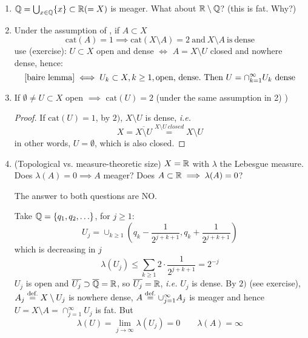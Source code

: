 \documentclass{article}
\begin{document}
\begin{remark}
\label{Baire remark}
\begin{enumerate}[1)]
    \item $\mathbb{Q} = \bigcup_{x\in \mathbb{Q}} \{x\} \subset \mathbb{R} (=X)$ is meager. What about $\mathbb{R} \setminus \mathbb{Q}$? (this is fat. Why?)
    \item Under the assumption of , if $A\subset X$  
    $$
    \text{cat}(A)=1 \implies \text{cat}(X \setminus A)=2 \ \text{and} \ X\setminus A \ \text{is} \ \text{dense}
    $$
    use (exercise): $U \subset X$ open and dense $\iff$ $A = X\setminus U$ closed and nowhere dense, hence:  
    \begin{equation*}
        \text{\Cref{baire lemma}} \iff U_k \subset X, k\geq 1, \text{open,\ dense}. \ \text{Then} \ U = \cap_{k=1}^{\infty} U_k \ \text{dense}
    \end{equation*}
    \item If $\emptyset \neq U \subset X$ open $\implies$ $\text{cat}(U)=2$ (under the same assumption in 2) )
    \begin{proof}
        If $\text{cat}(U)=1$, by $2)$, $X\setminus U$ is dense, \textit{i.e.}  
        $$
        X = \overline{X\setminus U}\overset{X\setminus U \ closed}{=} X\setminus U
        $$
        in other words, $U=\emptyset$, which is also closed.
    \end{proof}
    \item (Topological vs. measure-theoretic size)  $X=\mathbb{R}$ with $\lambda$ the Lebesgue measure. Does $\lambda(A)=0 \implies A $ meager? Does $A \subset \mathbb{R} \implies \lambda(A)=0$?  

    The answer to both questions are NO.  
    
    Take $\mathbb{Q} = \{q_1, q_2, \ldots\}$, for $j\geq 1$:  
    $$
    U_j = \cup_{k\geq 1} (q_k - \frac{1}{2^{j+k+1}}, q_k + \frac{1}{2^{j+k+1}})
    $$ 
    which is decreasing in $j$  
    $$
    \lambda(U_j) \leq \sum_{k\geq 1} 2 \cdot \frac{1}{2^{j+k+1}} = 2^{-j}
    $$
    $U_j$ is open and $\overline{U_j} \supset \overline{\mathbb{Q}} = \mathbb{R}$, so $\overline{U_j} = \mathbb{R}$, \textit{i.e.} $U_j$ is dense.  
    By $2)$ (see exercise), $A_j \stackrel{\text{def.}}{=} X \setminus U_j$ is nowhere dense, $A \stackrel{\text{def.}}{=} \cup_{j=1}^{\infty} A_j$ is meager and hence $U = X\setminus A=\cap_{j=1}^{\infty} U_j$ is fat. But  
    $$
    \lambda(U) = \lim_{j\to \infty} \lambda(U_j) = 0 \qquad \lambda(A)=\infty
    $$
\end{enumerate}
\end{remark}
\end{document}
